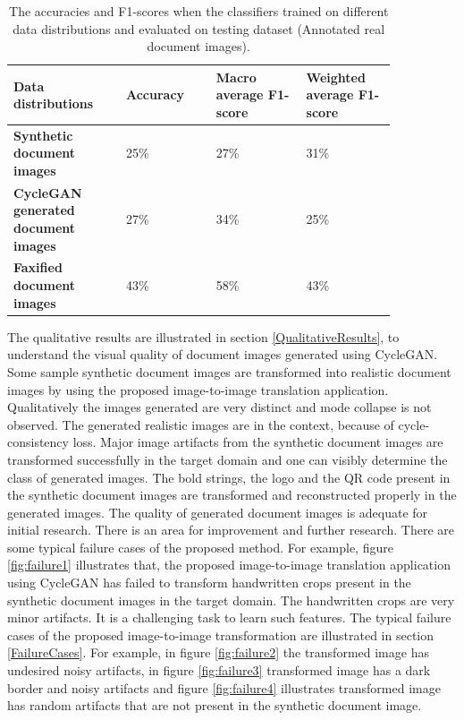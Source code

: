 \begin{table}[H]
\begin{tabular}{P{0.25\linewidth} P{0.20\linewidth} P{0.20\linewidth} P{0.20\linewidth}} 
	\toprule
	\bf{Data distributions} & \bf{Accuracy}  & \bf{Macro average F1-score} & \bf{Weighted average F1-score}\\[0.0ex] 
	\midrule
     \bf{Synthetic document images} & 25\% & 27\% & 31\%\\[0.0ex]
     \midrule
     \bf{\ac{CycleGAN} generated document images} & 27\% & 34\% & 25\%\\[0.0ex]
     \midrule
     \bf{Faxified document images} & 43\% & 58\% & 43\%\\[0.0ex]
     \bottomrule
\end{tabular}
 \caption[The accuracies and F1-scores when the classifiers trained on different data distributions and evaluated on testing dataset (Annotated real document images).]{The accuracies and F1-scores when the classifiers trained on different data distributions and evaluated on testing dataset (Annotated real document images).}
    \label{table:finalResults}
\end{table}



The qualitative results are illustrated in section \ref{QualitativeResults}, to understand the visual quality of document images generated using \ac{CycleGAN}. Some sample synthetic document images are transformed into realistic document images by using the proposed image-to-image translation application. Qualitatively the images generated are very distinct and mode collapse \cite{thanhtung2020catastrophic} is not observed. The generated realistic images are in the context, because of cycle-consistency loss. Major image artifacts from the synthetic document images are transformed successfully in the target domain and one can visibly determine the class of generated images. The bold strings, the logo and the QR code present in the synthetic document images are transformed and reconstructed properly in the generated images. The quality of generated document images is adequate for initial research. There is an area for improvement and further research. There are some typical failure cases of the proposed method. For example, figure \ref{fig:failure1} illustrates that, the proposed image-to-image translation application using \ac{CycleGAN} has failed to transform handwritten crops present in the synthetic document images in the target domain. The handwritten crops are very minor artifacts. It is a challenging task to learn such features. The typical failure cases of the proposed image-to-image transformation are illustrated in section \ref{FailureCases}. For example, in figure \ref{fig:failure2} the transformed image has undesired noisy artifacts, in figure \ref{fig:failure3} transformed image has a dark border and noisy artifacts and figure \ref{fig:failure4} illustrates transformed image has random artifacts that are not present in the synthetic document image. 


